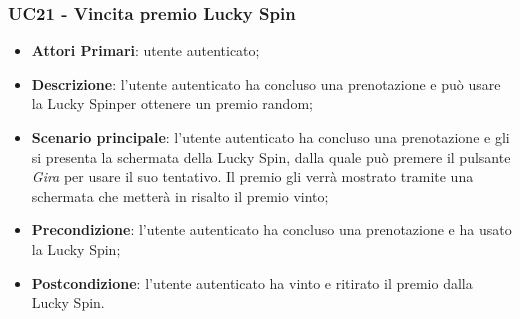 \subsubsection{UC21 - Vincita premio Lucky Spin}
\begin{itemize}
	\item \textbf{Attori Primari}: utente autenticato;
	\item \textbf{Descrizione}: l'utente autenticato ha concluso una prenotazione e può usare la Lucky Spin\glosp per ottenere un premio random;	
	\item \textbf{Scenario principale}: l'utente autenticato ha concluso una prenotazione e gli si presenta la schermata della Lucky Spin, dalla quale può premere il pulsante \textit{Gira} per usare il suo tentativo. Il premio gli verrà mostrato tramite una schermata che metterà in risalto il premio vinto;
	\item \textbf{Precondizione}: l'utente autenticato ha concluso una prenotazione e ha usato la Lucky Spin;
	\item \textbf{Postcondizione}: l'utente autenticato ha vinto e ritirato il premio dalla Lucky Spin.
\end{itemize}
